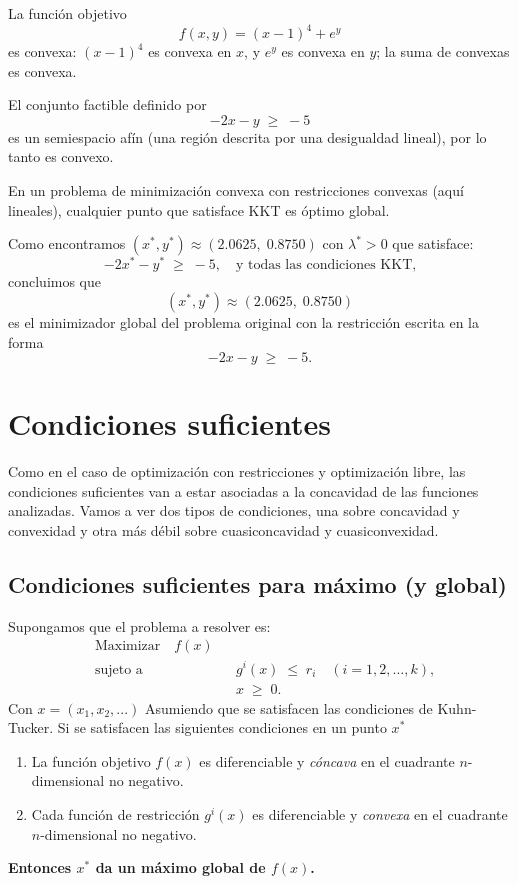 \documentclass{article}
\begin{document}
La función objetivo
\[
f(x,y) = (x-1)^4 + e^{y}
\]
es convexa: \((x-1)^4\) es convexa en \(x\), y \(e^{y}\) es convexa en \(y\); la suma de convexas es convexa.

El conjunto factible definido por
\[
-2x - y \;\ge\; -5
\]
es un semiespacio afín (una región descrita por una desigualdad lineal), por lo tanto es convexo.

En un problema de minimización convexa con restricciones convexas (aquí lineales), cualquier punto que satisface KKT es óptimo global.

Como encontramos \((x^*,y^*) \approx (2.0625,\;0.8750)\) con \(\lambda^*>0\) que satisface:
\[
-2x^* - y^* \;\ge\; -5,
\quad
\text{y todas las condiciones KKT,}
\]
concluimos que
\[
(x^*,y^*) \approx (2.0625,\;0.8750)
\]
es el minimizador global del problema original con la restricción escrita en la forma
\[
-2x - y \;\ge\; -5.
\]


\section*{Condiciones suficientes}
Como en el caso de optimización con restricciones y optimización libre, las condiciones suficientes van a estar asociadas a la concavidad de las funciones analizadas. Vamos a ver dos tipos de condiciones, una sobre concavidad y convexidad y otra más débil sobre cuasiconcavidad y cuasiconvexidad.

\subsection*{Condiciones suficientes para máximo (y global)}
Supongamos que el problema a resolver es:
\[
\begin{aligned}
&\text{Maximizar} \quad  f(x) \\
&\text{sujeto a} \quad && g^{i}(x) \;\le\; r_{i}
\quad (i = 1,2,\dots,k),\\
& && x \;\ge\; 0.
\end{aligned}
\]
Con $x=(x_1,x_2,...)$
Asumiendo que se satisfacen las condiciones de Kuhn-Tucker.
Si se satisfacen las siguientes condiciones en un punto $x^*$
\begin{enumerate}\color{teal}
  \item La función objetivo \(f(x)\) es diferenciable y \emph{cóncava} en el cuadrante \(n\)-dimensional no negativo.
  \item Cada función de restricción \(g^{i}(x)\) es diferenciable y \emph{convexa} en el cuadrante \(n\)-dimensional no negativo.
\end{enumerate}
\textbf{\color{teal}Entonces \(x^{*}\) da un máximo global de \(f(x)\).}
\end{document}
